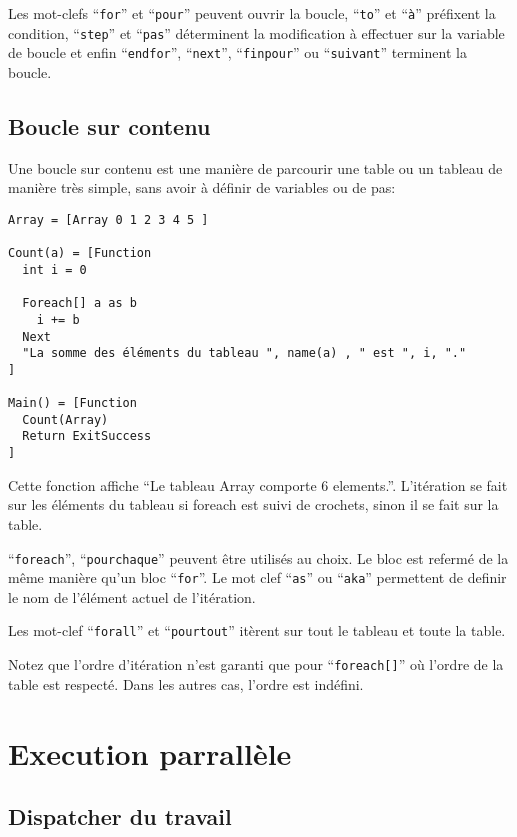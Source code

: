 \documentclass[a5paper, 12pt]{book}
\begin{document}
Les mot-clefs ``\verb!for!'' et ``\verb!pour!'' peuvent ouvrir la boucle,
``\verb!to!'' et ``\verb!à!'' préfixent la condition, ``\verb!step!'' et ``\verb!pas!''
déterminent la modification à effectuer sur la variable
de boucle et enfin ``\verb!endfor!'', ``\verb!next!'', ``\verb!finpour!'' ou
``\verb!suivant!'' terminent la boucle.

\subsection{Boucle sur contenu}

Une boucle sur contenu est une manière de parcourir
une table ou un tableau de manière très simple, sans
avoir à définir de variables ou de pas:\\

\begin{verbatim}
Array = [Array 0 1 2 3 4 5 ]

Count(a) = [Function
  int i = 0

  Foreach[] a as b
    i += b
  Next
  "La somme des éléments du tableau ", name(a) , " est ", i, "."
]

Main() = [Function
  Count(Array)
  Return ExitSuccess
]
\end{verbatim}

Cette fonction affiche ``Le tableau Array comporte 6 elements.''.
L'itération se fait sur les éléments du tableau si foreach
est suivi de crochets, sinon il se fait sur la table.

``\verb!foreach!'', ``\verb!pourchaque!'' peuvent être utilisés au choix.
Le bloc est refermé de la même manière qu'un bloc ``\verb!for!''.
Le mot clef ``\verb!as!'' ou ``\verb!aka!'' permettent de definir le nom
de l'élément actuel de l'itération.

Les mot-clef ``\verb!forall!'' et ``\verb!pourtout!'' itèrent sur tout
le tableau et toute la table.

Notez que l'ordre d'itération n'est garanti que pour
``\verb!foreach[]!'' où l'ordre de la table est respecté.
Dans les autres cas, l'ordre est indéfini.

\section{Execution parrallèle}

\subsection{Dispatcher du travail}
\end{document}
